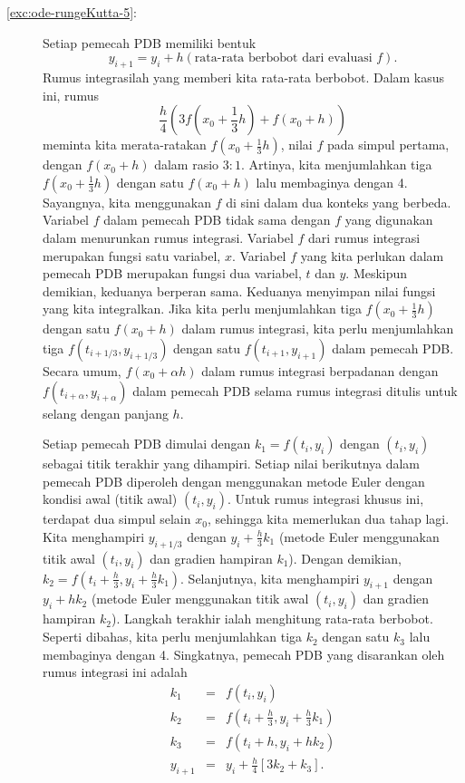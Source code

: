 \begin{description}
\item [{\ref{exc:ode-rungeKutta-5}:}] Setiap pemecah PDB memiliki bentuk
\[
y_{i+1}=y_{i}+h(\mbox{rata-rata berbobot dari evaluasi }f).
\]
Rumus integrasilah yang memberi kita rata-rata berbobot. Dalam kasus
ini, rumus 
\[
\frac{h}{4}\left(3f\left(x_{0}+\frac{1}{3}h\right)+f(x_{0}+h)\right)
\]
 meminta kita merata-ratakan $f(x_{0}+\frac{1}{3}h)$, nilai $f$
pada simpul pertama, dengan $f(x_{0}+h)$ dalam rasio $3:1$. Artinya,
kita menjumlahkan tiga $f(x_{0}+\frac{1}{3}h)$ dengan satu $f(x_{0}+h)$
lalu membaginya dengan 4. Sayangnya, kita menggunakan $f$ di sini
dalam dua konteks yang berbeda. Variabel $f$ dalam pemecah PDB tidak
sama dengan $f$ yang digunakan dalam menurunkan rumus integrasi.
Variabel $f$ dari rumus integrasi merupakan fungsi satu variabel,
$x$. Variabel $f$ yang kita perlukan dalam pemecah PDB merupakan
fungsi dua variabel, $t$ dan $y$. Meskipun demikian, keduanya berperan
sama. Keduanya menyimpan nilai fungsi yang kita integralkan. Jika
kita perlu menjumlahkan tiga $f(x_{0}+\frac{1}{3}h)$ dengan satu
$f(x_{0}+h)$ dalam rumus integrasi, kita perlu menjumlahkan tiga
$f(t_{i+1/3},y_{i+1/3})$ dengan satu $f(t_{i+1},y_{i+1})$ dalam
pemecah PDB. Secara umum, $f(x_{0}+\alpha h)$ dalam rumus integrasi
berpadanan dengan $f(t_{i+\alpha},y_{i+\alpha})$ dalam pemecah PDB
selama rumus integrasi ditulis untuk selang dengan panjang $h$. 

Setiap pemecah PDB dimulai dengan $k_{1}=f(t_{i},y_{i})$ dengan $(t_{i},y_{i})$
sebagai titik terakhir yang dihampiri. Setiap nilai berikutnya dalam
pemecah PDB diperoleh dengan menggunakan metode Euler dengan kondisi
awal (titik awal) $(t_{i},y_{i})$. Untuk rumus integrasi khusus ini,
terdapat dua simpul selain $x_{0}$, sehingga kita memerlukan dua
tahap lagi. Kita menghampiri $y_{i+1/3}$ dengan $y_{i}+\frac{h}{3}k_{1}$
(metode Euler menggunakan titik awal $(t_{i},y_{i})$ dan gradien
hampiran $k_{1}$). Dengan demikian, $k_{2}=f(t_{i}+\frac{h}{3},y_{i}+\frac{h}{3}k_{1})$.
Selanjutnya, kita menghampiri $y_{i+1}$ dengan $y_{i}+hk_{2}$ (metode
Euler menggunakan titik awal $(t_{i},y_{i})$ dan gradien hampiran
$k_{2}$). Langkah terakhir ialah menghitung rata-rata berbobot. Seperti
dibahas, kita perlu menjumlahkan tiga $k_{2}$ dengan satu $k_{3}$
lalu membaginya dengan 4. Singkatnya, pemecah PDB yang disarankan
oleh rumus integrasi ini adalah
\begin{eqnarray*}
k_{1} & = & f(t_{i},y_{i})\\
k_{2} & = & f\left(t_{i}+\frac{h}{3},y_{i}+\frac{h}{3}k_{1}\right)\\
k_{3} & = & f\left(t_{i}+h,y_{i}+hk_{2}\right)\\
y_{i+1} & = & y_{i}+\frac{h}{4}\left[3k_{2}+k_{3}\right].
\end{eqnarray*}


\end{description}
